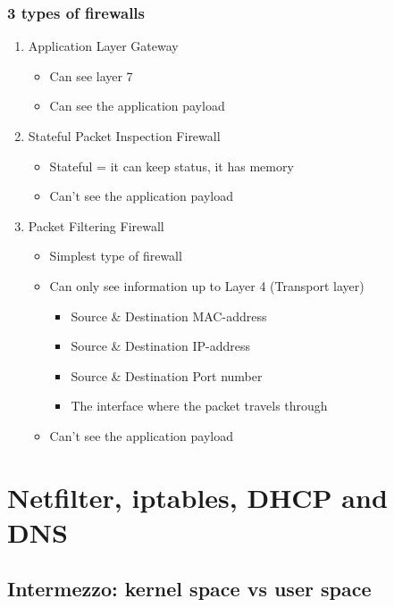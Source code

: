 \documentclass{article}
\begin{document}
\subsubsection{3 types of firewalls}

\begin{enumerate}
    \item Application Layer Gateway
    \begin{itemize}
        \item Can see layer 7
        \item Can see the application payload
    \end{itemize}
    \item Stateful Packet Inspection Firewall
    \begin{itemize}
        \item Stateful = it can keep status, it has memory
        \item Can't see the application payload
    \end{itemize}
    \item Packet Filtering Firewall
    \begin{itemize}
        \item Simplest type of firewall
        \item Can only see information up to Layer 4 (Transport layer)
        \begin{itemize}
            \item Source \& Destination MAC-address
            \item Source \& Destination IP-address
            \item Source \& Destination Port number
            \item The interface where the packet travels through
        \end{itemize}
        \item Can't see the application payload
    \end{itemize}
\end{enumerate}

\section{Netfilter, iptables, DHCP and DNS}

\subsection{Intermezzo: kernel space vs user space}
\end{document}
